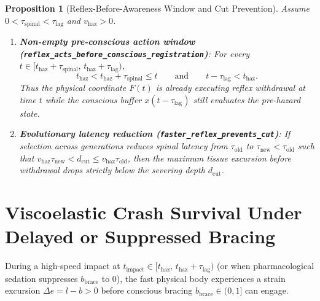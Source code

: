 \documentclass[11pt,a4paper]{article}
\newtheorem{proposition}[theorem]{Proposition}
\theoremstyle{definition}
\begin{document}
\begin{proposition}[Reflex-Before-Awareness Window and Cut Prevention]
\label{prop:reflex}
Assume $0 < \tau_{\mathrm{spinal}} < \tau_{\mathrm{lag}}$ and $v_{\mathrm{haz}} > 0$.
\begin{enumerate}
  \item \textbf{Non-empty pre-conscious action window (\texttt{reflex\_acts\_before\_conscious\_registration})}: For every $t \in [t_{\mathrm{haz}} + \tau_{\mathrm{spinal}},\, t_{\mathrm{haz}} + \tau_{\mathrm{lag}})$,
  \begin{equation}
    t_{\mathrm{haz}} < t_{\mathrm{haz}} + \tau_{\mathrm{spinal}} \le t \qquad \text{and} \qquad t - \tau_{\mathrm{lag}} < t_{\mathrm{haz}}.
  \end{equation}
  Thus the physical coordinate $F(t)$ is already executing reflex withdrawal at time $t$ while the conscious buffer $x(t - \tau_{\mathrm{lag}})$ still evaluates the pre-hazard state.
  \item \textbf{Evolutionary latency reduction (\texttt{faster\_reflex\_prevents\_cut})}: If selection across generations reduces spinal latency from $\tau_{\mathrm{old}}$ to $\tau_{\mathrm{new}} < \tau_{\mathrm{old}}$ such that $v_{\mathrm{haz}}\tau_{\mathrm{new}} < d_{\mathrm{cut}} \le v_{\mathrm{haz}}\tau_{\mathrm{old}}$, then the maximum tissue excursion before withdrawal drops strictly below the severing depth $d_{\mathrm{cut}}$.
\end{enumerate}
\end{proposition}

\section{Viscoelastic Crash Survival Under Delayed or Suppressed Bracing}

During a high-speed impact at $t_{\mathrm{impact}} \in [t_{\mathrm{haz}},\, t_{\mathrm{haz}} + \tau_{\mathrm{lag}})$ (or when pharmacological sedation suppresses $b_{\mathrm{brace}}$ to $0$), the fast physical body experiences a strain excursion $\Delta e = l - b > 0$ before conscious bracing $b_{\mathrm{brace}} \in (0, 1]$ can engage.
\end{document}
